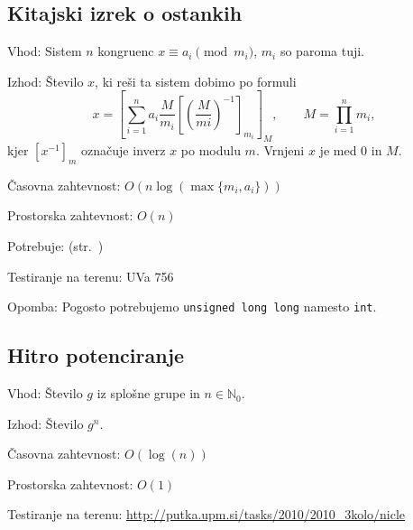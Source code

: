 \documentclass[a4paper,oneside,12pt]{article}
\def\N{\mathbb{N}}
\newenvironment{description*}%
{
\begin{description}
\setlength{\itemsep}{0pt}
\setlength{\parskip}{2pt}
}
{\end{description}}
\newcommand{\ull}{\texttt{unsigned long long}}
\begin{document}
\subsection{Kitajski izrek o ostankih}
\label{sec:ts:mod}
\begin{description*}
  \item[Vhod:] Sistem $n$ kongruenc $x \equiv a_i \pmod{m_i}$, $m_i$ so paroma tuji.
  \item[Izhod:] Število $x$, ki reši ta sistem dobimo po formuli
    \[ x =
      \left[\sum_{i=1}^na_i\frac{M}{m_i}\left[\left(\frac{M}{mi}\right)^{-1}\right]_{m_i}\right]_M,
      \qquad M = \prod_{i=1}^nm_i,
    \]
    kjer $[x^{-1}]_m$ označuje inverz $x$ po modulu $m$. Vrnjeni $x$ je med 0 in $M$.
  \item[Časovna zahtevnost:] $O(n \log(\max\{m_i, a_i\}))$
  \item[Prostorska zahtevnost:] $O(n)$
  \item[Potrebuje:]  (str.~\pageref{sec:ts:evk})
  \item[Testiranje na terenu:] UVa 756
  \item[Opomba:] Pogosto potrebujemo \ull{} namesto \texttt{int}.
\end{description*}

\subsection{Hitro potenciranje}
\label{sec:fastpow}
\begin{description*}
  \item[Vhod:] Število $g$ iz splošne grupe in $n \in \N_0$.
  \item[Izhod:] Število $g^n$.
  \item[Časovna zahtevnost:] $O(\log(n))$
  \item[Prostorska zahtevnost:] $O(1)$
  \item[Testiranje na terenu:] \url{http://putka.upm.si/tasks/2010/2010_3kolo/nicle}
\end{description*}
\end{document}
